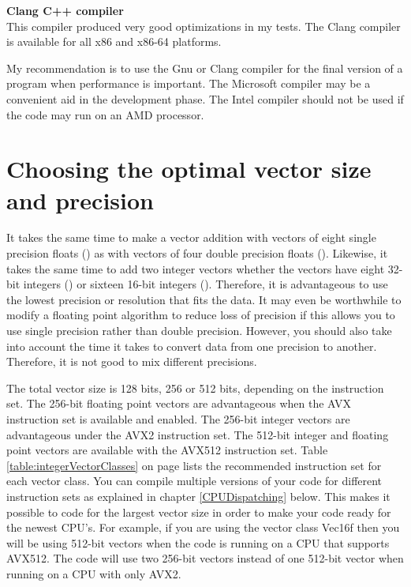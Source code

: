 \documentclass[vcl_manual.tex]{subfiles}
\begin{document}
\textbf{Clang C++ compiler}\\
This compiler produced very good optimizations in my tests. The Clang compiler is available for all x86 and x86-64 platforms.

My recommendation is to use the Gnu or Clang compiler for the final version of a program when performance is important. The Microsoft compiler may be a convenient aid in the development phase. The Intel compiler should not be used if the code may run on an AMD processor.


\section{Choosing the optimal vector size and precision} \label{ChoosingOptimalVectorSize}

It takes the same time to make a vector addition with vectors of eight single precision floats () as with vectors of four double precision floats (). Likewise, it takes the same time to add two integer vectors whether the vectors have eight 32-bit integers () or sixteen 16-bit integers (). Therefore, it is advantageous to use the lowest precision or resolution that fits the data. It may even be worthwhile to modify a floating point algorithm to reduce loss of precision if this allows you to use single precision rather than double precision. However, you should also take into account the time it takes to convert data from one precision to another. Therefore, it is not good to mix different precisions.

The total vector size is 128 bits, 256 or 512 bits, depending on the instruction set. 
The 256-bit floating point vectors are advantageous when the AVX instruction set is available and enabled. The 256-bit integer vectors are advantageous under the AVX2 instruction set. 
The 512-bit integer and floating point vectors are available with the AVX512 instruction set.
Table \ref{table:integerVectorClasses} on page \pageref{table:integerVectorClasses} lists the recommended instruction set for each vector class. 
You can compile multiple versions of your code for different instruction sets as explained in chapter \ref{CPUDispatching} below. This makes it possible to code for the largest vector size in order to make your code ready for the newest CPU's. 
For example, if you are using the vector class Vec16f then you will be using 512-bit vectors when the code is running on a CPU that supports AVX512. The code will use two 256-bit vectors instead of one 512-bit vector when running on a CPU with only AVX2.
\end{document}
